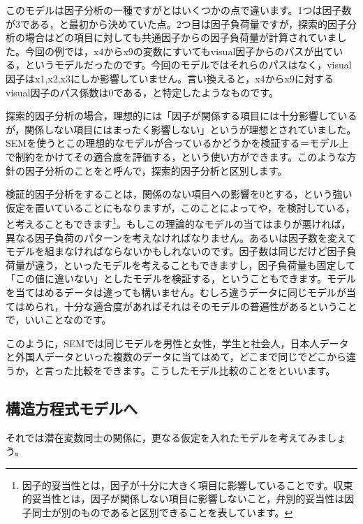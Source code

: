 \documentclass{ltjsbook}
\begin{document}
このモデルは因子分析の一種ですがとはいくつかの点で違います。1つは因子数が3である，と最初から決めていた点。2つ目は因子負荷量ですが，探索的因子分析の場合はどの項目に対しても共通因子からの因子負荷量が計算されていました。今回の例では，x4からx9の変数にすいてもvisual因子からのパスが出ている，というモデルだったのです。今回のモデルではそれらのパスはなく，visual因子はx1,x2,x3にしか影響していません。言い換えると，x4からx9に対するvisual因子のパス係数は0である，と特定したようなものです。

探索的因子分析の場合，理想的には「因子が関係する項目には十分影響しているが，関係しない項目にはまったく影響しない」というが理想とされていました。SEMを使うとこの理想的なモデルが合っているかどうかを検証する＝モデル上で制約をかけてその適合度を評価する，という使い方ができます。このような方針の因子分析のことをと呼んで，探索的因子分析と区別します。

検証的因子分析をすることは，関係のない項目への影響を0とする，という強い仮定を置いていることにもなりますが，このことによってや，を検討している，と考えることもできます\footnote{因子的妥当性とは，因子が十分に大きく項目に影響していることです。収束的妥当性とは，因子が関係しない項目に影響しないこと，弁別的妥当性は因子同士が別のものであると区別できることを表しています。}。もしこの理論的なモデルの当てはまりが悪ければ，異なる因子負荷のパターンを考えなければなりません。あるいは因子数を変えてモデルを組まなければならないかもしれないのです。因子数は同じだけど因子負荷量が違う，といったモデルを考えることもできますし，因子負荷量も固定して「この値に違いない」としたモデルを検証する，ということもできます。モデルを当てはめるデータは違っても構いません。むしろ違うデータに同じモデルが当てはめられ，十分な適合度があればそれはそのモデルの普遍性があるということで，いいことなのです。

このように，SEMでは同じモデルを男性と女性，学生と社会人，日本人データと外国人データといった複数のデータに当てはめて，どこまで同じでどこから違うか，と言った比較をできます。こうしたモデル比較のことをといいます。

\subsection{構造方程式モデルへ}
それでは潜在変数同士の関係に，更なる仮定を入れたモデルを考えてみましょう。
\end{document}
